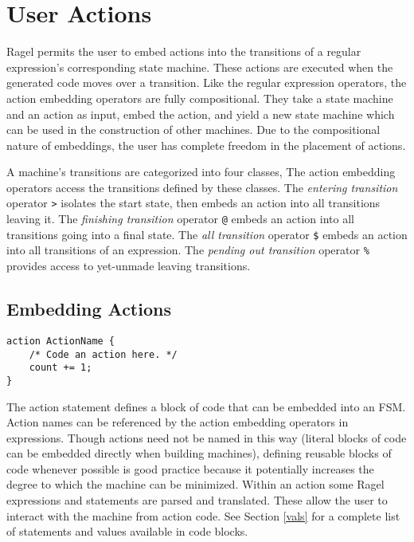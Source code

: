 \documentclass[letterpaper,11pt,oneside]{book}
\newcommand{\verbspace}{\vspace{10pt}}
\begin{document}
\chapter{User Actions}

Ragel permits the user to embed actions into the transitions of a regular
expression's corresponding state machine. These actions are executed when the
generated code moves over a transition.  Like the regular expression operators,
the action embedding operators are fully compositional. They take a state
machine and an action as input, embed the action, and yield a new state machine
which can be used in the construction of other machines. Due to the
compositional nature of embeddings, the user has complete freedom in the
placement of actions.

A machine's transitions are categorized into four classes, The action embedding
operators access the transitions defined by these classes.  The {\em entering
transition} operator \verb|>| isolates the start state, then embeds an action
into all transitions leaving it. The {\em finishing transition} operator
\verb|@| embeds an action into all transitions going into a final state.  The
{\em all transition} operator \verb|$| embeds an action into all transitions of
an expression. The {\em pending out transition} operator \verb|%| provides
access to yet-unmade leaving transitions. 

\section{Embedding Actions}

\begin{verbatim}
action ActionName {
    /* Code an action here. */
    count += 1;
}
\end{verbatim}
\verbspace

The action statement defines a block of code that can be embedded into an FSM.
Action names can be referenced by the action embedding operators in
expressions. Though actions need not be named in this way (literal blocks
of code can be embedded directly when building machines), defining reusable
blocks of code whenever possible is good practice because it potentially increases the
degree to which the machine can be minimized. Within an action some Ragel expressions
and statements are parsed and translated. These allow the user to interact with the machine
from action code. See Section \ref{vals} for a complete list of statements and
values available in code blocks. 
\end{document}
